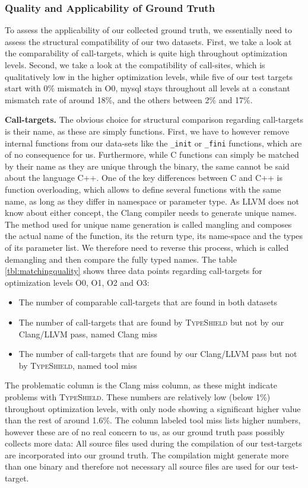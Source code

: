 \subsubsection{Quality and Applicability of Ground Truth}
\label{subsection:typeshieldprecision}
To assess the applicability of our collected ground truth, we essentially need to assess the structural compatibility of our two datasets.
First, we take a look at the comparability of call-targets, which is quite high throughout optimization levels. 
Second, we take a look at the compatibility of call-sites, which is qualitatively low in the higher optimization levels, while 
five of our test targets start with 0\% mismatch in O0, mysql stays throughout all levels at a constant mismatch 
rate of around 18\%, and the others between 2\% and 17\%.

\textbf{Call-targets.} The obvious choice for structural comparison regarding call-targets is their name, as these are simply functions. 
First, we have to however remove internal functions from our data-sets like the \texttt{\_init} or \texttt{\_fini} functions, which are of no consequence for us. 
Furthermore, while C functions can simply be matched by their name as they are unique through the binary, the same cannot be said about the 
language C++. One of the key differences between C and C++ is function overloading, which allows to define several functions with the same name, as 
long as they differ in namespace or parameter type. As LLVM does not know about either concept, the Clang compiler needs to generate unique names. 
The method used for unique name generation is called mangling and composes the actual name of the function, its the return type, its name-space and the 
types of its parameter list. We therefore need to reverse this process, which is called demangling and then compare the fully typed names.
The table \ref{tbl:matchingquality} shows three data points regarding call-targets for optimization levels O0, O1, O2 and O3:
\begin{itemize}
\item The number of comparable call-targets that are found in both datasets
\item The number of call-targets that are found by \textsc{TypeShield} but not by our Clang/LLVM pass, named Clang miss
\item The number of call-targets that are found by our Clang/LLVM pass but not by \textsc{TypeShield}, named tool miss
\end{itemize}
The problematic column is the Clang miss column, as these might indicate problems with \textsc{TypeShield}. These numbers are relatively low (below 1\%) 
throughout optimization levels, with only node showing a significant higher value than the rest of around 1.6\%. The column labeled tool miss lists 
higher numbers, however these are of no real concern to us, as our ground truth pass possibly collects more data: All source files used during the 
compilation of our test-targets are incorporated into our ground truth. The compilation might generate more than one binary and therefore not 
necessary all source files are used for our test-target.

